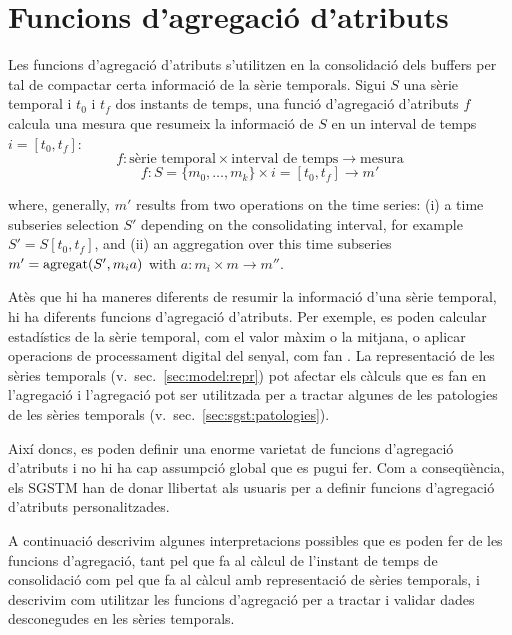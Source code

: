 
\section{Funcions d'agregació d'atributs}
\label{sec:model:interpolador}
\label{sec:model:agregador}


Les funcions d'agregació d'atributs s'utilitzen en la consolidació
dels buffers per tal de compactar certa informació de la sèrie
temporals. Sigui $S$ una sèrie temporal i $t_0$ i $t_f$ dos instants
de temps, una funció d'agregació d'atributs $f$ calcula una mesura que
resumeix la informació de $S$ en un interval de temps $i=[t_0,t_f]$:
\[
f: \text{sèrie temporal} \times \text{interval de temps}
\longrightarrow \text{mesura}
\]
\[
f: S=\{m_0,\ldots,m_k\} \times i=[t_0,t_f] \longrightarrow  m'
\]

where, generally, $m'$ results from two operations on the time series: (i) a time subseries selection $S'$ depending on the consolidating interval, for example $S' = S[t_0,t_f]$, and (ii) an aggregation over this time subseries  $m' = \operatorname*{agregat}(S',m_i a)$ with $a: m_i \times m\rightarrow m''$. 

Atès que hi ha maneres diferents de resumir la informació d'una sèrie
temporal, hi ha diferents funcions d'agregació d'atributs. Per
exemple, es poden calcular estadístics de la sèrie temporal, com el
valor màxim o la mitjana, o aplicar operacions de processament digital
del senyal, com fan \textcite{zhang11}.  La representació de les
sèries temporals (v.\ sec.~\ref{sec:model:repr}) pot afectar els
càlculs que es fan en l'agregació i l'agregació pot ser utilitzada per
a tractar algunes de les patologies de les sèries temporals
(v.\ sec.~\ref{sec:sgst:patologies}).


Així doncs, es poden definir una enorme varietat de funcions
d'agregació d'atributs i no hi ha cap assumpció global que es pugui
fer. Com a conseqüència, els \gls{SGSTM} han de donar llibertat als usuaris
per a definir funcions d'agregació d'atributs personalitzades.

A continuació descrivim algunes interpretacions possibles que es poden
fer de les funcions d'agregació, tant pel que fa al càlcul de
l'instant de temps de consolidació com pel que fa al càlcul amb
representació de sèries temporals, i descrivim com utilitzar les
funcions d'agregació per a tractar i validar dades desconegudes en les
sèries temporals.




